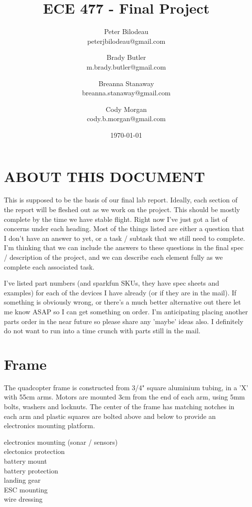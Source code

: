 \documentclass{article}
\begin{document}
\title{ECE 477 - Final Project}
\author{Peter Bilodeau\\
	peterjbilodeau@gmail.com\and
	Brady Butler\\
	m.brady.butler@gmail.com \and
	Breanna Stanaway\\
	breanna.stanaway@gmail.com\and
	Cody Morgan\\
	cody.b.morgan@gmail.com}
\date{\today}
\maketitle{}
\section{ABOUT THIS DOCUMENT}
This is supposed to be the basis of our final lab report.  Ideally, each section of the report will be fleshed out as we work on the project.  This should be mostly complete by the time we have stable flight.  Right now I've just got a list of concerns under each heading.  Most of the things listed are either a question that I don't have an answer to yet, or a task / subtask that we still need to complete.  I'm thinking that we can include the answers to these questions in the final spec / description of the project, and we can describe each element fully as we complete each associated task.

I've listed part numbers (and sparkfun SKUs, they have spec sheets and examples) for each of the devices I have already (or if they are in the mail).  If something is obviously wrong, or there's a much better alternative out there let me know ASAP so I can get something on order.  I'm anticipating placing another parts order in the near future so please share any 'maybe' ideas also.  I definitely do not want to run into a time crunch with parts still in the mail.

\section{Frame}
The quadcopter frame is constructed from 3/4" square aluminium tubing, in a 'X' with 55cm arms.  Motors are mounted 3cm from the end of each arm, using 5mm bolts, washers and locknuts.  The center of the frame has matching notches in each arm and plastic squares are bolted above and below to provide an electronics mounting platform.

electronics mounting (sonar / sensors)\\
electonics protection\\
battery mount\\
battery protection\\
landing gear\\
ESC mounting\\
wire dressing\\
\end{document}
